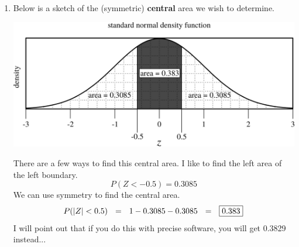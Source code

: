 \documentclass[12pt,letterpaper]{article}
\begin{document}
\begin{enumerate}
\begin{enumerate}
\item Below is a sketch of the (symmetric) {\bf central} area we wish to determine.
\begin{center}
\includegraphics[scale=0.8]{figures/hw3p2d.png}
\end{center}
There are a few ways to find this central area. I like to find the left area of the left boundary.
$$P(Z<-0.5) = 0.3085 $$
We can use symmetry to find the central area.
$$P(|Z|<0.5) ~~=~~ 1-0.3085-0.3085 ~~=~~ \fbox{0.383} $$
I will point out that if you do this with precise software, you will get 0.3829 instead...
\vfill
\end{enumerate}

\newpage
\newcommand{\N}[2]{\mathcal{N}\Big(#1,~ #2\Big)}


\end{enumerate}
\end{document}
